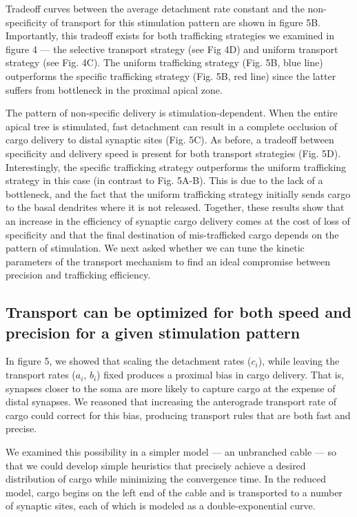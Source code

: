 \documentclass[11pt]{wlpeerj}
\begin{document}
Tradeoff curves between the average detachment rate constant and the non-specificity of transport for this stimulation pattern are shown in figure 5B.
Importantly, this tradeoff exists for both trafficking strategies we examined in figure 4 --- the selective transport strategy (see Fig 4D) and uniform transport strategy (see Fig. 4C).
The uniform trafficking strategy (Fig. 5B, blue line) outperforms the specific trafficking strategy (Fig. 5B, red line) since the latter suffers from bottleneck in the proximal apical zone.

The pattern of non-specific delivery is stimulation-dependent.
When the entire apical tree is stimulated, fast detachment can result in a complete occlusion of cargo delivery to distal synaptic sites (Fig. 5C).
As before, a tradeoff between specificity and delivery speed is present for both transport strategies (Fig. 5D).
Interestingly, the specific trafficking strategy outperforms the uniform trafficking strategy in this case (in contrast to Fig. 5A-B).
This is due to the lack of a bottleneck, and the fact that the uniform trafficking strategy initially sends cargo to the basal dendrites where it is not released.
Together, these results show that an increase in the efficiency of synaptic cargo delivery comes at the cost of loss of specificity and that the final destination of mis-trafficked cargo depends on the pattern of stimulation. We next asked whether we can tune the kinetic parameters of the transport mechanism to find an ideal compromise between precision and trafficking efficiency.

\subsection*{Transport can be optimized for both speed and precision for a given stimulation pattern}

In figure 5, we showed that scaling the detachment rates ($c_i$), while leaving the transport rates ($a_i$, $b_i$) fixed produces a proximal bias in cargo delivery.
That is, synapses closer to the soma are more likely to capture cargo at the expense of distal synapses.
We reasoned that increasing the anterograde transport rate of cargo could correct for this bias, producing transport rules that are both fast and precise.

We examined this possibility in a simpler model --- an unbranched cable --- so that we could develop simple heuristics that precisely achieve a desired distribution of cargo while minimizing the convergence time.
In the reduced model, cargo begins on the left end of the cable and is transported to a number of synaptic sites, each of which is modeled as a double-exponential curve.
\end{document}
